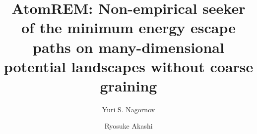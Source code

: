 \documentclass[preprint,12pt]{elsarticle}
\begin{document}
\newpage

\begin{frontmatter}




\title{AtomREM: Non-empirical seeker of the minimum energy escape paths on many-dimensional potential landscapes without coarse graining}

\author[a]{Yuri S. Nagornov}
\author[a]{Ryosuke Akashi}

\address[a]{Department of Physics, The University of Tokyo, Hongo, Bunkyo-ku, Tokyo 113-0033, Japan}


\end{frontmatter}
\end{document}
